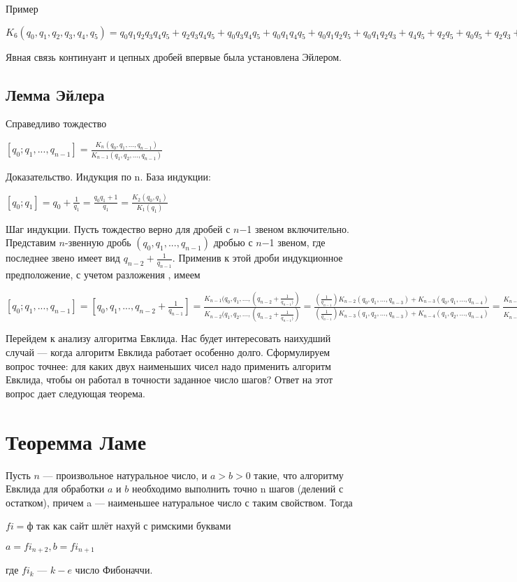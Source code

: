 \documentclass[12pt]{article}
\begin{document}
Пример\par
$K_6(q_0, q_1, q_2, q_3, q_4, q_5) = q_0 q_1 q_2 q_3 q_4 q_5 + q_2 q_3 q_4 q_5 + q_0 q_3 q_4 q_5 + q_0 q_1 q_4 q_5 + q_0 q_1 q_2 q_5 + q_0 q_1 q_2 q_3 + q_4 q_5 + q_2 q_5 + q_0 q_5 + q_2 q_3 + q_0 q_3 + q_0 q_1 + 1$\par
Явная связь континуант и цепных дробей впервые была установлена
Эйлером.
\subsection{Лемма Эйлера} 
Справедливо тождество\par
$[q_0;q_1,...,q_{n-1}] = \frac{K_n(q_0, q_1, . . . , q_{n−1})}{K_{n-1}(q_1, q_2, . . . , q_{n−1})}$\par

Доказательство. Индукция по n. База индукции:\par
$[q_0;q_1] = q_0 + \frac{1}{q_1} = \frac{q_0q_1 + 1}{q_1} = \frac{K_2(q_0,q_1)}{K_1(q_1)}$\par
Шаг индукции. Пусть тождество верно для дробей с $n$−1 звеном включительно. Представим $n$-звенную дробь $(q_0, q_1, . . . , q_{n−1})$ дробью с $n$−1 звеном, где последнее звено имеет вид $q_{n−2} + \frac{1}{q_{n-1}}$. Применив к этой дроби индукционное предположение, с учетом разложения , имеем\par
$[q_0; q_1, . . . , q_{n−1}] = [q_0, q_1, . . . , q_{n−2} + \frac{1}{q_{n-1}}] = \frac{K_{n-1}(q_0, q_1, . . . , (q_{n-2}+\frac{1}{q_{n-1})})}{K_{n-2}(q_1, q_2, . . . , (q_{n-2}+\frac{1}{q_{n-1})})} = \frac{(\frac{1}{q_{n-1}}) K_{n-2}(q_0,q_1,...,q_{n-3})+K_{n-3}(q_0,q_1,...,q_{n-4})}{(\frac{1}{q_{n-1}}) K_{n-3}(q_1,q_2,...,q_{n-3})+K_{n-4}(q_1,q_2,...,q_{n-4})} = \frac{K_{n-1}(q_0,q_1,...,q_{n-2}) + \frac{K_{n-2}(q_0,q_1,...,q_{n-3})}{q_{n-1}}}{K_{n-2}(q_1,q_2,...,q_{n-2}) + \frac{K_{n-3}(q_1,q_2,...,q_{n-3})}{q_{n-1}}} = \frac{K_{n}(q_0,q_1,...,q_{n-1})}{K_{n-1}(q_1,q_2,...,q_{n-1})}$\par
Перейдем к анализу алгоритма Евклида. Нас будет интересовать наихудший случай — когда алгоритм Евклида работает особенно долго. Сформулируем вопрос точнее: для каких двух наименьших чисел надо применить алгоритм Евклида, чтобы он работал в точности заданное число шагов? Ответ на этот вопрос дает следующая теорема.

\section{Теоремма Ламе}
Пусть $n$ — произвольное натуральное число, и $a > b > 0$ такие, что алгоритму Евклида для обработки $a$ и $b$ необходимо выполнить точно n шагов (делений с остатком), причем a — наименьшее натуральное число с таким свойством. Тогда\par
$fi = $ф так как сайт шлёт нахуй с римскими буквами \par
$a = fi_{n+2}, b = fi_{n+1}$\par
где $fi_k$ — $k-e$ число Фибоначчи.
\end{document}
